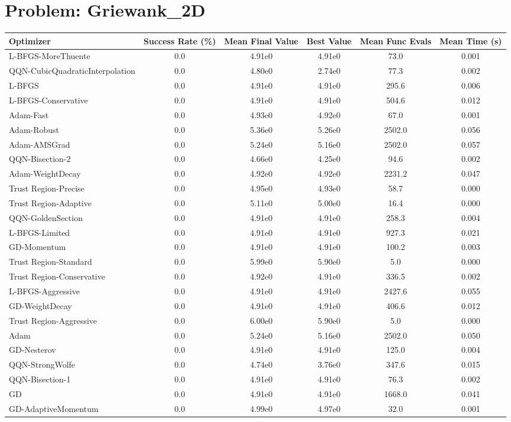 \documentclass{article}
\begin{document}
\section{Problem: Griewank\_2D}
\begin{longtable}{p{3cm}*{5}{c}}
\toprule
\textbf{Optimizer} & \textbf{Success Rate (\%)} & \textbf{Mean Final Value} & \textbf{Best Value} & \textbf{Mean Func Evals} & \textbf{Mean Time (s)} \\
\midrule
L-BFGS-MoreThuente & 0.0 & 4.91e0 & 4.91e0 & 73.0 & 0.001 \\
QQN-CubicQuadraticInterpolation & 0.0 & 4.80e0 & 2.74e0 & 77.3 & 0.002 \\
L-BFGS & 0.0 & 4.91e0 & 4.91e0 & 295.6 & 0.006 \\
L-BFGS-Conservative & 0.0 & 4.91e0 & 4.91e0 & 504.6 & 0.012 \\
Adam-Fast & 0.0 & 4.93e0 & 4.92e0 & 67.0 & 0.001 \\
Adam-Robust & 0.0 & 5.36e0 & 5.26e0 & 2502.0 & 0.056 \\
Adam-AMSGrad & 0.0 & 5.24e0 & 5.16e0 & 2502.0 & 0.057 \\
QQN-Bisection-2 & 0.0 & 4.66e0 & 4.25e0 & 94.6 & 0.002 \\
Adam-WeightDecay & 0.0 & 4.92e0 & 4.92e0 & 2231.2 & 0.047 \\
Trust Region-Precise & 0.0 & 4.95e0 & 4.93e0 & 58.7 & 0.000 \\
Trust Region-Adaptive & 0.0 & 5.11e0 & 5.00e0 & 16.4 & 0.000 \\
QQN-GoldenSection & 0.0 & 4.91e0 & 4.91e0 & 258.3 & 0.004 \\
L-BFGS-Limited & 0.0 & 4.91e0 & 4.91e0 & 927.3 & 0.021 \\
GD-Momentum & 0.0 & 4.91e0 & 4.91e0 & 100.2 & 0.003 \\
Trust Region-Standard & 0.0 & 5.99e0 & 5.90e0 & 5.0 & 0.000 \\
Trust Region-Conservative & 0.0 & 4.92e0 & 4.91e0 & 336.5 & 0.002 \\
L-BFGS-Aggressive & 0.0 & 4.91e0 & 4.91e0 & 2427.6 & 0.055 \\
GD-WeightDecay & 0.0 & 4.91e0 & 4.91e0 & 406.6 & 0.012 \\
Trust Region-Aggressive & 0.0 & 6.00e0 & 5.90e0 & 5.0 & 0.000 \\
Adam & 0.0 & 5.24e0 & 5.16e0 & 2502.0 & 0.050 \\
GD-Nesterov & 0.0 & 4.91e0 & 4.91e0 & 125.0 & 0.004 \\
QQN-StrongWolfe & 0.0 & 4.74e0 & 3.76e0 & 347.6 & 0.015 \\
QQN-Bisection-1 & 0.0 & 4.91e0 & 4.91e0 & 76.3 & 0.002 \\
GD & 0.0 & 4.91e0 & 4.91e0 & 1668.0 & 0.041 \\
GD-AdaptiveMomentum & 0.0 & 4.99e0 & 4.97e0 & 32.0 & 0.001 \\
\bottomrule
\end{longtable}
\end{document}
